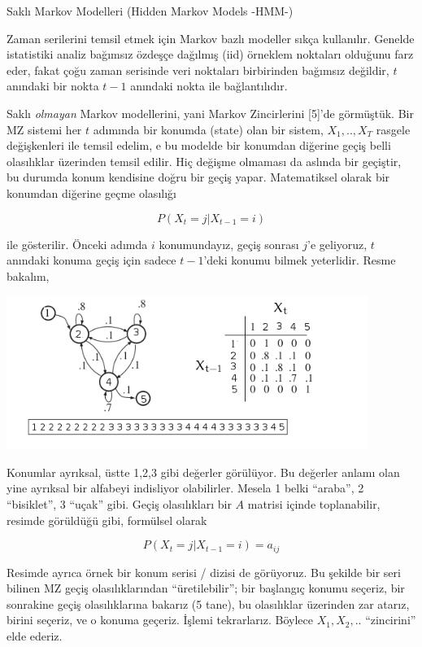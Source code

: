 \documentclass[12pt,fleqn]{article}\usepackage{../../common}
\begin{document}
Saklı Markov Modelleri (Hidden Markov Models -HMM-)

Zaman serilerini temsil etmek için Markov bazlı modeller sıkça
kullanılır. Genelde istatistiki analiz bağımsız özdeşçe dağılmış (iid)
örneklem noktaları olduğunu farz eder, fakat çoğu zaman serisinde veri
noktaları birbirinden bağımsız değildir, $t$ anındaki bir nokta $t-1$
anındaki nokta ile bağlantılıdır. 

Saklı {\em olmayan} Markov modellerini, yani Markov Zincirlerini [5]'de
görmüştük. Bir MZ sistemi her $t$ adımında bir konumda (state) olan bir
sistem, $X_1,..,X_T$ rasgele değişkenleri ile temsil edelim, e bu modelde
bir konumdan diğerine geçiş belli olasılıklar üzerinden temsil edilir. Hiç
değişme olmaması da aslında bir geçiştir, bu durumda konum kendisine doğru
bir geçiş yapar. Matematiksel olarak bir konumdan diğerine geçme olasılığı

$$ P(X_t = j | X_{t-1} = i)  $$

ile gösterilir. Önceki adımda $i$ konumundayız, geçiş sonrası $j$'e
geliyoruz, $t$ anındaki konuma geçiş için sadece $t-1$'deki konumu bilmek
yeterlidir. Resme bakalım,

\includegraphics[height=5cm]{tser_hmm_01.png}

Konumlar ayrıksal, üstte 1,2,3 gibi değerler görülüyor. Bu değerler anlamı
olan yine ayrıksal bir alfabeyi indisliyor olabilirler. Mesela 1 belki
``araba'', 2 ``bisiklet'', 3 ``uçak'' gibi.  Geçiş olasılıkları bir $A$
matrisi içinde toplanabilir, resimde görüldüğü gibi, formülsel olarak

$$ P(X_t = j | X_{t-1} = i) = a_{ij} $$

Resimde ayrıca örnek bir konum serisi / dizisi de görüyoruz. Bu şekilde bir
seri bilinen MZ geçiş olasılıklarından ``üretilebilir''; bir başlangıç
konumu seçeriz, bir sonrakine geçiş olasılıklarına bakarız (5 tane), bu
olasılıklar üzerinden zar atarız, birini seçeriz, ve o konuma
geçeriz. İşlemi tekrarlarız. Böylece $X_1,X_2,..$ ``zincirini'' elde
ederiz.
\end{document}
